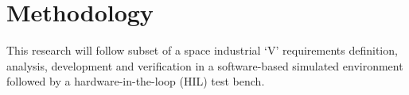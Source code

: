 
\section{Methodology}\label{CHAP1_5}


This research will follow subset of a space industrial ‘V’ requirements definition, analysis, development and verification in a software-based simulated environment followed by a hardware-in-the-loop (HIL) test bench. 

